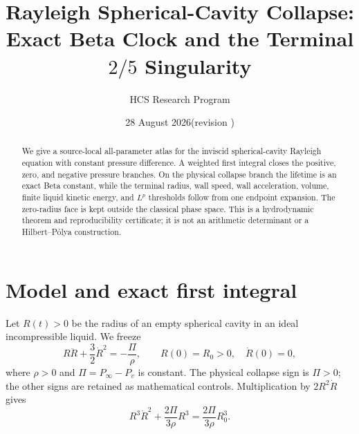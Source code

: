 \documentclass[11pt]{article}
\title{Rayleigh Spherical-Cavity Collapse: Exact Beta Clock and the Terminal \(2/5\) Singularity}
\author{HCS Research Program}
\date{28 August 2026\quad (revision \CRevisionRound)}
\begin{document}
\maketitle
\begin{abstract}
We give a source-local all-parameter atlas for the inviscid spherical-cavity
Rayleigh equation with constant pressure difference.  A weighted first
integral closes the positive, zero, and negative pressure branches.  On the
physical collapse branch the lifetime is an exact Beta constant, while the
terminal radius, wall speed, wall acceleration, volume, finite liquid kinetic
energy, and \(L^p\) thresholds follow from one endpoint expansion.  The
zero-radius face is kept outside the classical phase space.  This is a
hydrodynamic theorem and reproducibility certificate; it is not an arithmetic
determinant or a Hilbert--Pólya construction.
\end{abstract}

\section{Model and exact first integral}
Let \(R(t)>0\) be the radius of an empty spherical cavity in an ideal
incompressible liquid.  We freeze
\begin{equation}
 R\ddot R+\frac32\dot R^2=-\frac{\Pi}{\rho},
 \qquad R(0)=R_0>0,\quad \dot R(0)=0,
 \tag{1}
\end{equation}
where \(\rho>0\) and \(\Pi=P_\infty-P_v\) is constant.  The physical
collapse sign is \(\Pi>0\); the other signs are retained as mathematical
controls.  Multiplication by \(2R^2\dot R\) gives
\begin{equation}
 R^3\dot R^2+\frac{2\Pi}{3\rho}R^3
 =\frac{2\Pi}{3\rho}R_0^3. \tag{2}
\end{equation}
\end{document}
